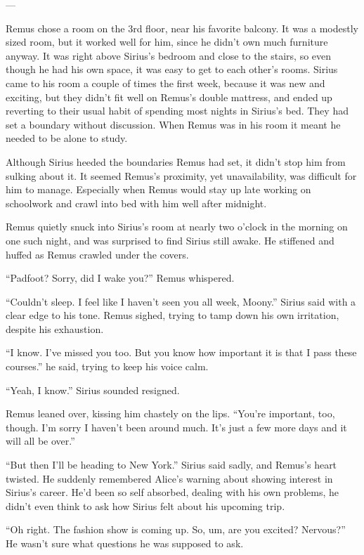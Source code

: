\documentclass[12pt,twoside,openright]{memoir}
\begin{document}
---

Remus chose a room on the 3rd floor, near his favorite balcony. It was a modestly sized room, but it worked well for him, since he didn't own much furniture anyway. It was right above Sirius's bedroom and close to the stairs, so even though he had his own space, it was easy to get to each other's rooms. Sirius came to his room a couple of times the first week, because it was new and exciting, but they didn't fit well on Remus's double mattress, and ended up reverting to their usual habit of spending most nights in Sirius's bed. They had set a boundary without discussion. When Remus was in his room it meant he needed to be alone to study. 

Although Sirius heeded the boundaries Remus had set, it didn't stop him from sulking about it. It seemed Remus's proximity, yet unavailability, was difficult for him to manage. Especially when Remus would stay up late working on schoolwork and crawl into bed with him well after midnight.

Remus quietly snuck into Sirius's room at nearly two o'clock in the morning on one such night, and was surprised to find Sirius still awake. He stiffened and huffed as Remus crawled under the covers. 

``Padfoot? Sorry, did I wake you?'' Remus whispered.

``Couldn't sleep. I feel like I haven't seen you all week, Moony.'' Sirius said with a clear edge to his tone. Remus sighed, trying to tamp down his own irritation, despite his exhaustion. 

``I know. I've missed you too. But you know how important it is that I pass these courses.'' he said, trying to keep his voice calm.

``Yeah, I know.'' Sirius sounded resigned.

Remus leaned over, kissing him chastely on the lips. ``You're important, too, though. I'm sorry I haven't been around much. It's just a few more days and it will all be over.''

``But then I'll be heading to New York.'' Sirius said sadly, and Remus's heart twisted. He suddenly remembered Alice's warning about showing interest in Sirius's career. He'd been so self absorbed, dealing with his own problems, he didn't even think to ask how Sirius felt about his upcoming trip.

``Oh right. The fashion show is coming up. So, um, are you excited? Nervous?'' He wasn't sure what questions he was supposed to ask.
\end{document}
